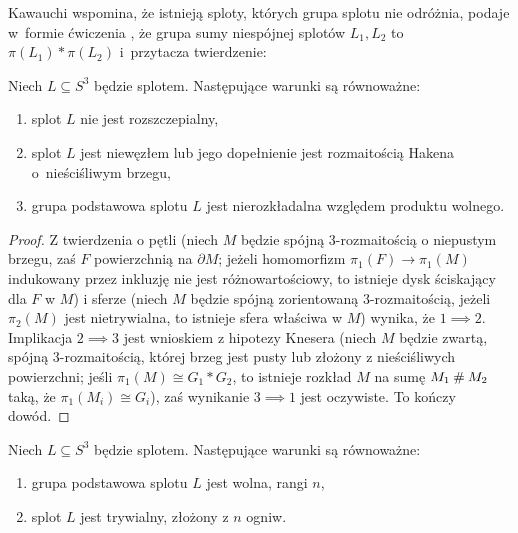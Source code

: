 Kawauchi wspomina, że istnieją sploty, których grupa splotu nie odróżnia, podaje w~formie ćwiczenia \cite[s. 73]{kawauchi1996}, że grupa sumy niespójnej splotów $L_1, L_2$ to $\pi(L_1) * \pi(L_2)$ i~przytacza twierdzenie:

\begin{proposition}
    Niech $L \subseteq S^3$ będzie splotem.
    Następujące warunki są równoważne:
    \begin{enumerate}
        \item splot $L$ nie jest rozszczepialny,
%
        \item splot $L$ jest niewęzłem lub jego dopełnienie jest rozmaitością Hakena o~nieściśliwym brzegu,
%
        \item grupa podstawowa splotu $L$ jest nierozkładalna względem produktu wolnego.
    \end{enumerate}
\end{proposition}

\begin{proof}
    Z twierdzenia o pętli (niech $M$ będzie spójną 3-rozmaitością o niepustym brzegu, zaś $F$ powierzchnią na $\partial M$; jeżeli homomorfizm $\pi_1(F) \to \pi_1(M)$ indukowany przez inkluzję nie jest różnowartościowy, to istnieje dysk ściskający dla $F$ w $M$) i sferze (niech $M$ będzie spójną zorientowaną 3-rozmaitością, jeżeli $\pi_2(M)$ jest nietrywialna, to istnieje sfera właściwa w $M$) wynika, że $1 \implies 2$.
    Implikacja $2 \implies 3$ jest wnioskiem z hipotezy Knesera (niech $M$ będzie zwartą, spójną 3-rozmaitością, której brzeg jest pusty lub złożony z nieściśliwych powierzchni; jeśli $\pi_1(M) \cong G_1 * G_2$, to istnieje rozkład $M$ na sumę $M_1 \mathbin{\#} M_2$ taką, że $\pi_1(M_i) \cong G_i$), zaś wynikanie $3 \implies 1$ jest oczywiste.
%
%
%
    To kończy dowód.
\end{proof}

\begin{corollary}
    Niech $L \subseteq S^3$ będzie splotem.
    Następujące warunki są równoważne:
    \begin{enumerate}
        \item grupa podstawowa splotu $L$ jest wolna, rangi $n$,
        \item splot $L$ jest trywialny, złożony z $n$ ogniw.
    \end{enumerate}
\end{corollary}

